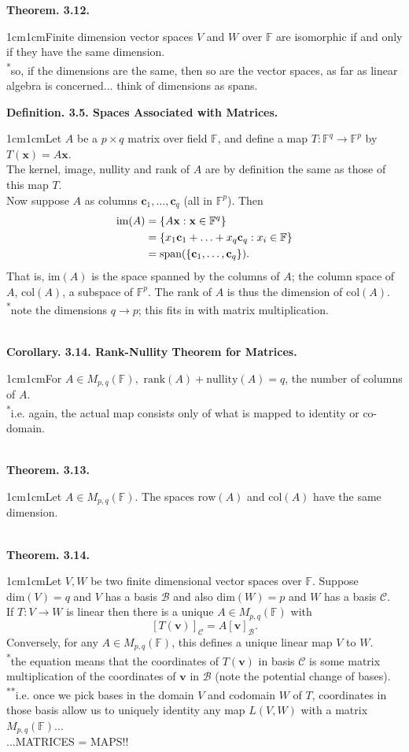 \documentclass{article}
\newcommand{\vect}[1]{\mathbf{#1}}
\newcommand{\definition}[2]{\textbf{Definition. #1.}\begin{adjustwidth}{1cm}{1cm}#2\end{adjustwidth}}
\newcommand{\theorem}[2]{\textbf{Theorem. #1.}\begin{adjustwidth}{1cm}{1cm}#2\end{adjustwidth}}
\newcommand{\corollary}[2]{\textbf{Corollary. #1.}\begin{adjustwidth}{1cm}{1cm}#2\end{adjustwidth}}
\begin{document}
\theorem{3.12}{Finite dimension vector spaces $V$ and $W$ over $\mathbb{F}$ are isomorphic if and only if they have the same dimension.\\[1\baselineskip]\textsuperscript{*}so, if the dimensions are the same, then so are the vector spaces, as far as linear algebra is concerned... think of dimensions as spans.}\newpage
\definition{3.5. Spaces Associated with Matrices}{Let $A$ be a $p \times q$ matrix over field $\mathbb{F}$, and define a map $T: \mathbb{F}^q \rightarrow \mathbb{F}^p$ by $T(\vect{x}) = A\vect{x}$.\\The kernel, image, nullity and rank of $A$ are by definition the same as those of this map $T$.\\Now suppose $A$ as columns $\vect{c}_1, \ldots , \vect{c}_q$ (all in $\mathbb{F}^p$). Then \begin{align} \text{im}(A) &= \{A \vect{x}: \vect{x} \in \mathbb{F}^q \} \notag \\ &= \{ x_1 \vect{c}_1 + \ldots + x_q \vect{c}_q : x_i \in \mathbb{F} \} \notag \\ &= \text{span}( \{ \vect{c}_1 , \ldots , \vect{c}_q \}) \notag. \end{align}That is, $\text{im}(A)$ is the space spanned by the columns of $A$; the column space of $A$, $\text{col}(A)$, a subspace of $\mathbb{F}^p$. The rank of $A$ is thus the dimension of $\text{col}(A)$.\\[1\baselineskip]\textsuperscript{*}note the dimensions $q \rightarrow p$; this fits in with matrix multiplication.}~\\
\corollary{3.14. Rank-Nullity Theorem for Matrices}{For $A \in M_{p,q}(\mathbb{F}),$ $\text{rank}(A) + \text{nullity}(A) = q$, the number of columns of $A$.\\\textsuperscript{*}i.e. again, the actual map consists only of what is mapped to identity or co-domain.}~\\
\theorem{3.13}{Let $A \in M_{p,q}(\mathbb{F})$. The spaces $\text{row}(A)$ and $\text{col}(A)$ have the same dimension.}~\\
\theorem{3.14}{Let $V, W$ be two finite dimensional vector spaces over $\mathbb{F}$. Suppose $\text{dim}(V) = q$ and $V$ has a basis $\mathcal{B}$ and also $\text{dim}(W) = p$ and $W$ has a basis $\mathcal{C}$.\\If $T: V \rightarrow W$ is linear then there is a unique $A \in M_{p,q}(\mathbb{F})$ with \[ [T(\vect{v})]_\mathcal{C} = A[\vect{v}]_\mathcal{B}.\]Conversely, for any $A \in M_{p,q}(\mathbb{F})$, this defines a unique linear map $V$ to $W$.\\[1\baselineskip]\textsuperscript{*}the equation means that the coordinates of $T(\vect{v})$ in basis $\mathcal{C}$ is some matrix multiplication of the coordinates of $\vect{v}$ in $\mathcal{B}$ (note the potential change of bases).\\\textsuperscript{**}i.e. once we pick bases in the domain $V$ and codomain $W$ of $T$, coordinates in those basis allow us to uniquely identity any map $L(V,W)$ with a matrix $M_{p,q}(\mathbb{F})$...\\...MATRICES = MAPS!!}\newpage
\end{document}
